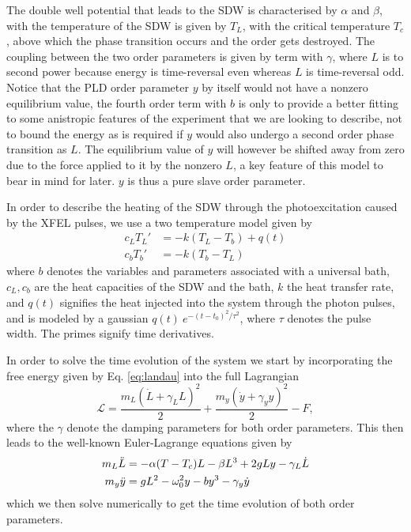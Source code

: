 The double well potential that leads to the SDW is characterised by $\alpha$ and $\beta$, with the temperature of the SDW is given by $T_L$, with the critical temperature $T_c$, above which the phase transition occurs and the order gets destroyed. The coupling between the two order parameters is given by term with $\gamma$, where $L$ is to second power because energy is time-reversal even whereas $L$ is time-reversal odd. Notice that the PLD order parameter $y$ by itself would not have a nonzero equilibrium value, the fourth order term with $b$ is only to provide a better fitting to some anistropic features of the experiment that we are looking to describe, not to bound the energy as is required if $y$ would also undergo a second order phase transition as $L$. The equilibrium value of $y$ will however be shifted away from zero due to the force applied to it by the nonzero $L$, a key feature of this model to bear in mind for later. $y$ is thus a pure slave order parameter.

In order to describe the heating of the SDW through the photoexcitation caused by the XFEL pulses, we use a two temperature model given by
\begin{align}
	c_L T_L' &= -k(T_L - T_b) + q(t) \\
	c_b T_b' &= -k(T_b - T_L)
\end{align}
where $b$ denotes the variables and parameters associated with a universal bath, $c_L, c_b$ are the heat capacities of the SDW and the bath, $k$ the heat transfer rate, and $q(t)$ signifies the heat injected into the system through the photon pulses, and is modeled by a gaussian $q(t) ~ e^{-(t-t_0)^2/\tau^2}$, where $\tau$ denotes the pulse width. The primes signify time derivatives.

In order to solve the time evolution of the system we start by incorporating the free energy given by Eq. \ref{eq:landau} into the full Lagrangian
\begin{equation}
    \mathcal{L} = \frac{m_L (\dot{L} + \gamma_L L)^2}{2} + \frac{m_y (\dot{y} + \gamma_y y)^2}{2} - F,
\end{equation}
where the $\gamma$ denote the damping parameters for both order parameters. This then leads to the well-known Euler-Lagrange equations given by
\begin{align}
    m_L \Ddot{L} &= -\alpha(T-T_c)L - \beta L^3 + 2g L y - \gamma_L \dot{L} \label{eq:L_diffeq}\\
    m_y \Ddot{y} &=gL^2 -\omega_0^2 y  - b y^3 - \gamma_y \dot{y} 
\end{align}
which we then solve numerically to get the time evolution of both order parameters.
